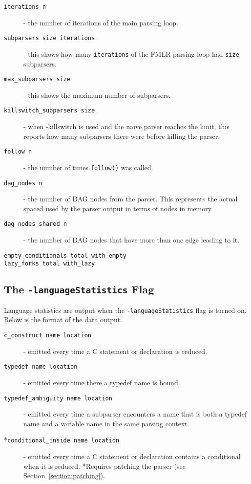 \documentclass{article}
\begin{document}
\begin{description}
\item[\texttt{iterations n}] - the number of iterations of the main parsing
  loop.
\item[\texttt{subparsers size iterations}] - this shows how many \verb"iterations"
  of the FMLR parsing loop had \verb"size" subparsers.
\item[\texttt{max\_subparsers size}] - this shows the maximum number of
  subparsers.
\item[\texttt{killswitch\_subparsers size}] - when -killswitch is used and
  the naive parser reaches the limit, this reports how many subparsers
  there were before killing the parser.
\item[\texttt{follow n}] - the number of times \verb"follow()" was called.
\item[\texttt{dag\_nodes n}] - the number of DAG nodes from the
  parser.  This represents the actual spaced used by the parser output
  in terms of nodes in memory.
\item[\texttt{dag\_nodes\_shared n}] - the number of DAG nodes that
  have more than one edge leading to it.
\item[\texttt{empty\_conditionals total with\_empty}]
\item[\texttt{lazy\_forks total with\_lazy}]
\end{description}

\subsection{The \texttt{-languageStatistics} Flag}

Language statistics are output when the \verb"-languageStatistics" flag is
turned on.  Below is the format of the data output.

\begin{description}
\item[\texttt{c\_construct name location}] - emitted every time a C
  statement or declaration is reduced.
\item[\texttt{typedef name location}] - emitted every time there a typedef
  name is bound.
\item[\texttt{typedef\_ambiguity name location}] - emitted every time a
  subparser encounters a name that is both a typedef name and a
  variable name in the same parsing context.
\item[*\texttt{conditional\_inside name location}] - emitted every
  time a C statement or declaration contains a conditional when it is
  reduced.  *Requires patching the parser (see
  Section~\ref{section:patching}).
\end{description}
\end{document}
